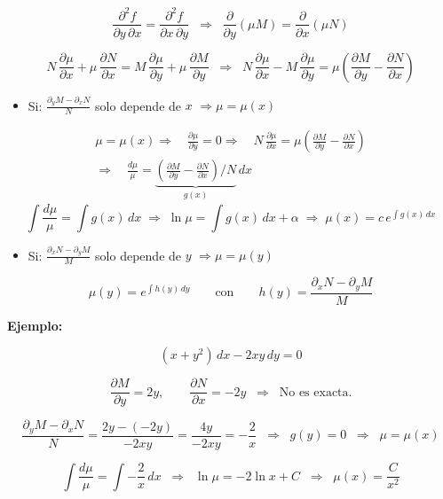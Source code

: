 \documentclass[a4paper,12pt]{article}
\begin{document}
\[
\frac{\partial^2 f}{\partial y\,\partial x}=\frac{\partial^2 f}{\partial x\,\partial y}
\;\;\Rightarrow\;\;
\frac{\partial}{\partial y}(\mu M)=\frac{\partial}{\partial x}(\mu N)
\]

\[
N\,\frac{\partial \mu}{\partial x}+\mu\,\frac{\partial N}{\partial x}
=
M\,\frac{\partial \mu}{\partial y}+\mu\,\frac{\partial M}{\partial y}
\;\;\Rightarrow\;\;
N\,\frac{\partial \mu}{\partial x}-M\,\frac{\partial \mu}{\partial y}
=
\mu\!\left(\frac{\partial M}{\partial y}-\frac{\partial N}{\partial x}\right)
\]

\begin{itemize}
\item Si: $\displaystyle \frac{\partial_y M-\partial_x N}{N}$ solo depende de $x$ $\Rightarrow \mu=\mu(x)$
\end{itemize}

\[
\begin{gathered}
\mu = \mu(x) \Rightarrow\quad \frac{\partial \mu}{\partial y} = 0 
\Rightarrow\quad N\,\frac{\partial \mu}{\partial x} 
= \mu\!\left(\frac{\partial M}{\partial y} - \frac{\partial N}{\partial x}\right) \\[4pt]
\Rightarrow\quad 
\frac{d\mu}{\mu} =
\underbrace{\left(\frac{\partial M}{\partial y} - \frac{\partial N}{\partial x}\right)\!\Big/ N}_{g(x)}\, dx
\end{gathered}
\]
\[
\int \frac{d\mu}{\mu}=\int g(x)\,dx
\;\Rightarrow\;
\ln\mu=\int g(x)\,dx+\alpha
\;\Rightarrow\;
\mu(x)=c\,e^{\int g(x)\,dx}
\]

\begin{itemize}
\item Si: $\displaystyle \frac{\partial_x N-\partial_y M}{M}$ solo depende de $y$ $\Rightarrow \mu=\mu(y)$
\end{itemize}

\[
\mu(y)=e^{\int h(y)\,dy}
\qquad\text{con}\qquad
h(y)=\frac{\partial_x N-\partial_y M}{M}
\]

\textbf{Ejemplo:}

\[
(x+y^2)\,dx - 2xy\,dy = 0
\]

\[
\frac{\partial M}{\partial y} = 2y, 
\qquad 
\frac{\partial N}{\partial x} = -2y
\;\;\Rightarrow\;\; \text{No es exacta.}
\]

\[
\frac{\partial_y M - \partial_x N}{N} = \frac{2y - (-2y)}{-2xy} = \frac{4y}{-2xy} = -\frac{2}{x}
\;\;\Rightarrow\;\; g(y)=0
\;\;\Rightarrow\;\; \mu=\mu(x)
\]

\[
\int \frac{d\mu}{\mu} = \int -\frac{2}{x}\,dx
\;\;\Rightarrow\;\;
\ln\mu = -2\ln x + C
\;\;\Rightarrow\;\;
\mu(x)=\frac{C}{x^2}
\]
\end{document}
